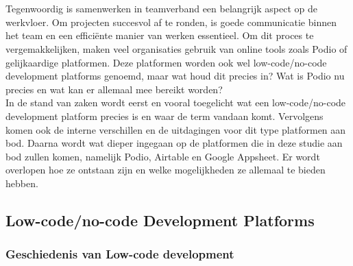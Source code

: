 \chapter{}%
\label{ch:stand-van-zaken}



Tegenwoordig is samenwerken in teamverband een belangrijk aspect op de werkvloer. Om projecten succesvol af te ronden, is goede communicatie binnen het team en een efficiënte manier van werken essentieel. Om dit proces te vergemakkelijken, maken veel organisaties gebruik van online tools zoals Podio of gelijkaardige platformen. Deze platformen worden ook wel low-code/no-code development platforms genoemd, maar wat houd dit precies in? Wat is Podio nu precies en wat kan er allemaal mee bereikt worden? \\
 
In de stand van zaken wordt eerst en vooral toegelicht wat een low-code/no-code development platform precies is en waar de term vandaan komt. Vervolgens komen ook de interne verschillen en de uitdagingen voor dit type platformen aan bod. Daarna wordt wat dieper ingegaan op de platformen die in deze studie aan bod zullen komen, namelijk Podio, Airtable en Google Appsheet. Er wordt overlopen hoe ze ontstaan zijn en welke mogelijkheden ze allemaal te bieden hebben. \\

\section{Low-code/no-code Development Platforms} 
\label{sec:low_code}

\subsection{Geschiedenis van Low-code development}
\label{subsec:geschiedenis_low_code}

